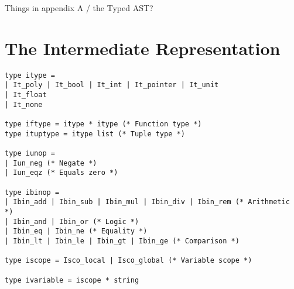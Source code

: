 \documentclass[12pt,twoside,notitlepage]{report}
\begin{document}
Things in appendix A / the Typed AST?


\clearpage

\chapter{The Intermediate Representation}
\begin{verbatim}
type itype =
| It_poly | It_bool | It_int | It_pointer | It_unit
| It_float
| It_none

type iftype = itype * itype (* Function type *)
type ituptype = itype list (* Tuple type *)

type iunop =
| Iun_neg (* Negate *)
| Iun_eqz (* Equals zero *)

type ibinop =
| Ibin_add | Ibin_sub | Ibin_mul | Ibin_div | Ibin_rem (* Arithmetic *)
| Ibin_and | Ibin_or (* Logic *)
| Ibin_eq | Ibin_ne (* Equality *)
| Ibin_lt | Ibin_le | Ibin_gt | Ibin_ge (* Comparison *)

type iscope = Isco_local | Isco_global (* Variable scope *)

type ivariable = iscope * string


\end{verbatim}
\end{document}
